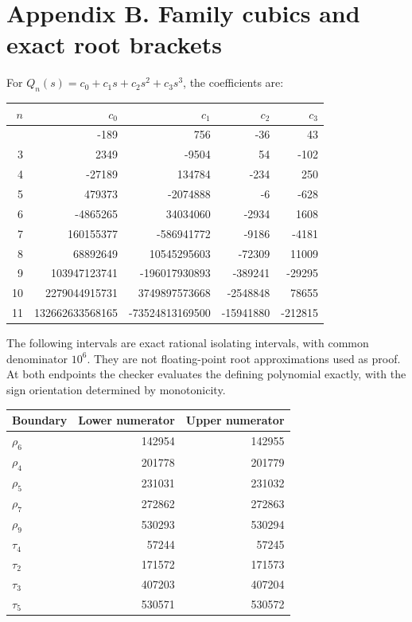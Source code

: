\documentclass[
  11pt,
  a4paper,
]{article}
\begin{document}
\section{Appendix B. Family cubics and exact root
brackets}\label{appendix-b.-family-cubics-and-exact-root-brackets}

For \(Q_n(s)=c_0+c_1s+c_2s^2+c_3s^3\), the coefficients are:

\begin{longtable}[]{@{}rrrrr@{}}
\toprule\noalign{}
\(n\) & \(c_0\) & \(c_1\) & \(c_2\) & \(c_3\) \\
\midrule\noalign{}
\endhead
\bottomrule\noalign{}
\endlastfoot
2 & -189 & 756 & -36 & 43 \\
3 & 2349 & -9504 & 54 & -102 \\
4 & -27189 & 134784 & -234 & 250 \\
5 & 479373 & -2074888 & -6 & -628 \\
6 & -4865265 & 34034060 & -2934 & 1608 \\
7 & 160155377 & -586941772 & -9186 & -4181 \\
8 & 68892649 & 10545295603 & -72309 & 11009 \\
9 & 103947123741 & -196017930893 & -389241 & -29295 \\
10 & 2279044915731 & 3749897573668 & -2548848 & 78655 \\
11 & 132662633568165 & -73524813169500 & -15941880 & -212815 \\
\end{longtable}

The following intervals are exact rational isolating intervals, with
common denominator \(10^6\). They are not floating-point root
approximations used as proof. At both endpoints the checker evaluates
the defining polynomial exactly, with the sign orientation determined by
monotonicity.

\begin{longtable}[]{@{}lrr@{}}
\toprule\noalign{}
Boundary & Lower numerator & Upper numerator \\
\midrule\noalign{}
\endhead
\bottomrule\noalign{}
\endlastfoot
\(\rho_6\) & 142954 & 142955 \\
\(\rho_4\) & 201778 & 201779 \\
\(\rho_5\) & 231031 & 231032 \\
\(\rho_7\) & 272862 & 272863 \\
\(\rho_9\) & 530293 & 530294 \\
\(\tau_4\) & 57244 & 57245 \\
\(\tau_2\) & 171572 & 171573 \\
\(\tau_3\) & 407203 & 407204 \\
\(\tau_5\) & 530571 & 530572 \\
\end{longtable}
\end{document}
